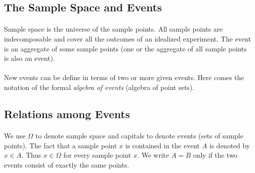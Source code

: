 \documentclass{article}
\numberwithin{equation}{subsection}
\begin{document}
		\subsection{The Sample Space and Events} 
			\paragraph{} Sample space is the universe of the sample points. All sample points are indecomposable and cover all the outcomes of an idealized experiment. The event is an aggregate of some sample points (one or the aggregate of all sample points is also an event).
			\paragraph{} New events can be define in terms of two or more given events. Here comes the notation of the formal \textit{algebra of events} (algebra of point sets).
		\subsection{Relations among Events}
			\paragraph{} We use $\Omega$ to denote sample space and capitals to denote events (sets of sample points). The fact that a sample point $x$ is contained in the event $A$ is denoted by $x \in A$. Thus $x \in \Omega$ for every sample point $x$. We write $A=B$ only if the two events consist of exactly the same points.
\end{document}

